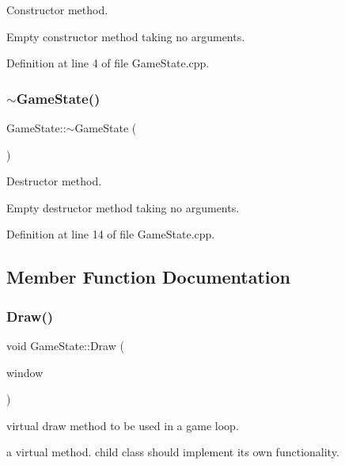 Constructor method. 

Empty constructor method taking no arguments. 

Definition at line 4 of file Game\+State.\+cpp.

\mbox{\label{class_game_state_ae623df5042cd0c17daa3394fdcb397b3}} 
\subsubsection{\texorpdfstring{$\sim$\+Game\+State()}{~GameState()}}
{\footnotesize\ttfamily Game\+State\+::$\sim$\+Game\+State (\begin{DoxyParamCaption}{ }\end{DoxyParamCaption})\hspace{0.3cm}{\ttfamily [virtual]}}



Destructor method. 

Empty destructor method taking no arguments. 

Definition at line 14 of file Game\+State.\+cpp.



\subsection{Member Function Documentation}
\mbox{\label{class_game_state_a8741c5c696c6c366beb4b845c08c3cf8}} 
\subsubsection{\texorpdfstring{Draw()}{Draw()}}
{\footnotesize\ttfamily void Game\+State\+::\+Draw (\begin{DoxyParamCaption}\item[{sf\+::\+Render\+Window \&}]{window }\end{DoxyParamCaption})\hspace{0.3cm}{\ttfamily [virtual]}}



virtual draw method to be used in a game loop. 

a virtual method. child class should implement its own functionality. 

